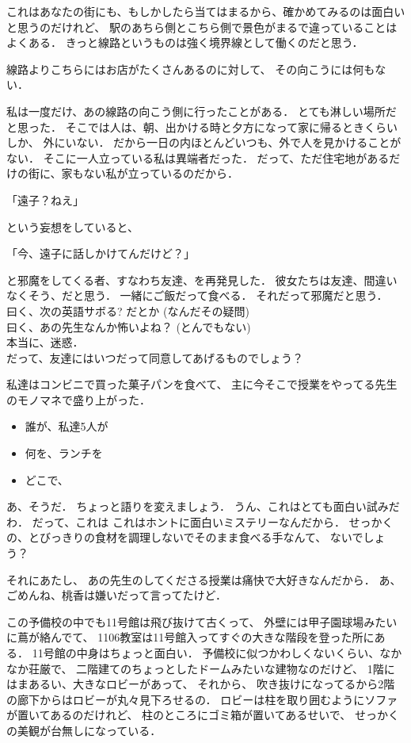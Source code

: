 \documentclass[]{article}
\begin{document}
これはあなたの街にも、もしかしたら当てはまるから、確かめてみるのは面白いと思うのだけれど、
駅のあちら側とこちら側で景色がまるで違っていることはよくある．
きっと線路というものは強く境界線として働くのだと思う．

線路よりこちらにはお店がたくさんあるのに対して、
その向こうには何もない．

私は一度だけ、あの線路の向こう側に行ったことがある．
とても淋しい場所だと思った．
そこでは人は、朝、出かける時と夕方になって家に帰るときくらいしか、
外にいない． だから一日の内ほとんどいつも、外で人を見かけることがない．
そこに一人立っている私は異端者だった．
だって、ただ住宅地があるだけの街に、家もない私が立っているのだから．

「遠子？ねえ」

という妄想をしていると、

「今、遠子に話しかけてんだけど？」

と邪魔をしてくる者、すなわち友達、を再発見した．
彼女たちは友達、間違いなくそう、だと思う． 一緒にご飯だって食べる．
それだって邪魔だと思う．\\曰く、次の英語サボる? だとか
(なんだその疑問)\\曰く、あの先生なんか怖いよね？
(とんでもない)\\本当に、迷惑．\\だって、友達にはいつだって同意してあげるものでしょう？

私達はコンビニで買った菓子パンを食べて、
主に今そこで授業をやってる先生のモノマネで盛り上がった．

\begin{itemize}[<+->]
\itemsep1pt\parskip0pt
\item
  誰が、私達5人が
\item
  何を、ランチを
\item
  どこで、
\end{itemize}

あ、そうだ． ちょっと語りを変えましょう．
うん、これはとても面白い試みだわ． だって、これは
これはホントに面白いミステリーなんだから．
せっかくの、とびっきりの食材を調理しないでそのまま食べる手なんて、
ないでしょう？

それにあたし、 あの先生のしてくださる授業は痛快で大好きなんだから．
あ、ごめんね、桃香は嫌いだって言ってたけど．

この予備校の中でも11号館は飛び抜けて古くって、
外壁には甲子園球場みたいに蔦が絡んでて、
1106教室は11号館入ってすぐの大きな階段を登った所にある．
11号館の中身はちょっと面白い．
予備校に似つかわしくないくらい、なかなか荘厳で、
二階建てのちょっとしたドームみたいな建物なのだけど、
1階にはまあるい、大きなロビーがあって、 それから、
吹き抜けになってるから2階の廊下からはロビーが丸々見下ろせるの．
ロビーは柱を取り囲むようにソファが置いてあるのだけれど、
柱のところにゴミ箱が置いてあるせいで、
せっかくの美観が台無しになっている．
\end{document}
